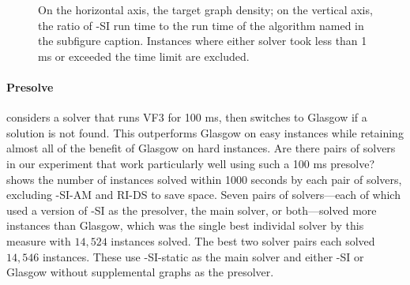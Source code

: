 \begin{figure}[htb]
    \centering
    \caption{On the horizontal axis, the target graph density; on the vertical axis, the ratio of \McSplit-SI run time to
            the run time of the algorithm named in the subfigure caption.
            Instances where either solver took less than 1 ms or exceeded the time limit are excluded.}
    \label{figure:density-runtime-ratio}
\end{figure}

\FloatBarrier

\paragraph*{Presolve} \cite{DBLP:conf/gbrpr/Solnon19} considers a solver that
runs VF3 for 100 ms, then switches to Glasgow if a solution is not found. This
outperforms Glasgow on easy instances while retaining almost all of the benefit
of Glasgow on hard instances.  Are there pairs of solvers in our experiment
that work particularly well using such a 100 ms presolve?
 shows the number of instances solved
within 1000 seconds by each pair of solvers, excluding \McSplit-SI-AM and RI-DS
to save space.  Seven pairs of solvers---each of which used a version of \McSplit-SI
as the presolver, the main solver, or both---solved more instances than Glasgow,
which was the single
best individal solver by this measure with $14,524$ instances solved.
The best two solver pairs
each solved $14,546$ instances.  These use \McSplit-SI-static as the main
solver and either \McSplit-SI or Glasgow without supplemental graphs as the
presolver.


